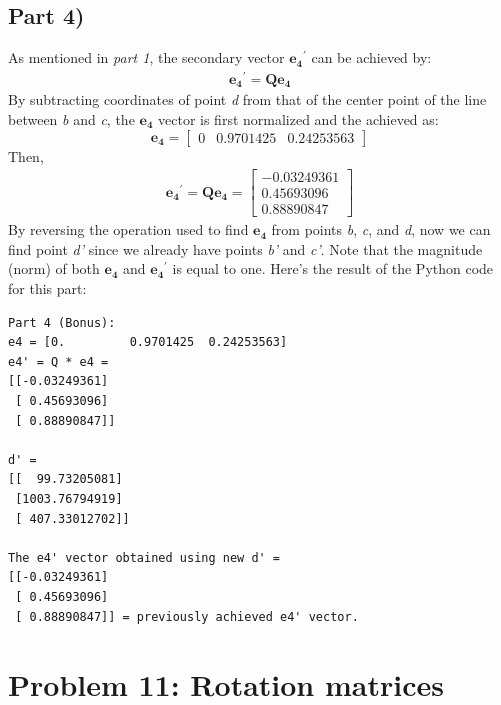 \documentclass[conference]{IEEEtran}
\begin{document}
\subsection*{Part 4)}
As mentioned in \textit{part 1}, the secondary vector $\mathbf{e_4}^\prime$ can be achieved by:
\begin{align}
    \mathbf{e_4}^\prime = \mathbf{Q} \mathbf{e_4}
\end{align}
By subtracting coordinates of point \textit{d} from that of the center point of the line between \textit{b} and \textit{c}, the $\mathbf{e_4}$ vector is first normalized and the achieved as:
$$
\mathbf{e_4} = \begin{bmatrix}
    0 & 0.9701425 & 0.24253563
\end{bmatrix}
$$
Then,
\begin{align}
    \mathbf{e_4}^\prime = \mathbf{Q} \mathbf{e_4} = 
    \begin{bmatrix}
        -0.03249361 \\
        0.45693096 \\
        0.88890847
    \end{bmatrix}
\end{align}
By reversing the operation used to find $\mathbf{e_4}$ from points \textit{b}, \textit{c}, and \textit{d}, now we can find point \textit{d'} since we already have points \textit{b'} and \textit{c'}. Note that the magnitude (norm) of both $\mathbf{e_4}$ and $\mathbf{e_4}^\prime$ is equal to one. Here's the result of the Python code for this part:

\scriptsize
\begin{verbatim}
Part 4 (Bonus):
e4 = [0.         0.9701425  0.24253563]
e4' = Q * e4 =
[[-0.03249361]
 [ 0.45693096]
 [ 0.88890847]]

d' =
[[  99.73205081]
 [1003.76794919]
 [ 407.33012702]]

The e4' vector obtained using new d' =
[[-0.03249361]
 [ 0.45693096]
 [ 0.88890847]] = previously achieved e4' vector.
\end{verbatim}




\section{Problem 11: Rotation matrices}
\end{document}

